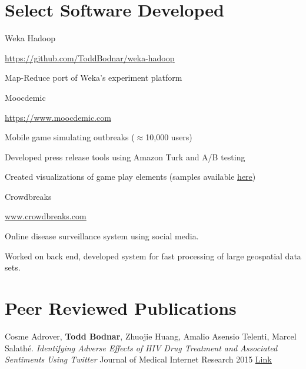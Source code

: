 \documentclass[margin,line]{res}
\newcommand{\linkToUrl}[1]{{\color{blue}\underline{\href{#1}{Link}}}}
\newenvironment{list1}{
  \begin{list}{\ding{113}}{%
      \setlength{\itemsep}{0in}
      \setlength{\parsep}{0in} \setlength{\parskip}{0in}
      \setlength{\topsep}{0in} \setlength{\partopsep}{0in} 
      \setlength{\leftmargin}{0.17in}}}{\end{list}}
\begin{document}
\begin{resume}
\section{\sc Select Software Developed}
Weka Hadoop
\begin{list1}
\item[] \underline{\color{blue} \href{https://github.com/ToddBodnar/weka-hadoop}{https://github.com/ToddBodnar/weka-hadoop}}
\item[] Map-Reduce port of Weka's experiment platform
\end{list1}

Moocdemic
\begin{list1}
\item[] \underline{\color{blue} \href{https://www.moocdemic.com}{https://www.moocdemic.com}}
\item[] Mobile game simulating outbreaks (\(\approx\)10,000 users)
\item[] Developed press release tools using Amazon Turk and A/B testing 
\item[] Created visualizations of game play elements (samples available \underline{\color{blue} \href{http://www.toddbodnar.com/gallery/moocdemic.html}{here}})  
\end{list1}

Crowdbreaks%
\begin{list1}
\item[] \underline{\color{blue} \href{www.crowdbreaks.com}{www.crowdbreaks.com}}
\item[] Online disease surveillance system using social media.
\item[] Worked on back end, developed system for fast processing of large geospatial data sets.
\end{list1}

\section{\sc Peer Reviewed Publications}

\begin{etaremune}[start=7,leftmargin=13pt]

\item Cosme Adrover, \textbf{Todd Bodnar}, Zhuojie Huang, Amalio Asensio Telenti, Marcel Salath\'e. \textit{Identifying Adverse Effects of HIV Drug Treatment and Associated Sentiments Using Twitter} Journal of Medical Internet Research 2015 \linkToUrl{http://bit.ly/1LVKPAi}


\end{etaremune}
\end{resume}
\end{document}
